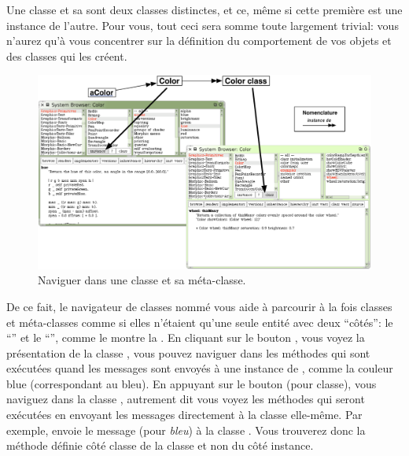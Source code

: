 \documentclass[a4paper,10pt,twoside]{book}
\begin{document}
Une classe et sa  sont deux classes distinctes, et ce, m\^eme si cette premi\`ere est une instance de l'autre. Pour vous, tout ceci sera somme toute largement trivial: vous n'aurez qu'\`a vous concentrer sur la d\'efinition du comportement de vos objets et des classes qui les cr\'eent.

\begin{figure}[htb]
\begin{center}
\includegraphics[width=\textwidth]{Color-Buttons}
\caption{Naviguer dans une classe et sa m\'eta-classe.
\label{fig:Buttons}}
\end{center}
\end{figure}

De ce fait, le navigateur de classes nomm\'e  vous
aide \`a parcourir \`a la fois classes et m\'eta-classes comme si elles
n'\'etaient qu'une seule entit\'e avec deux ``c\^ot\'es'': le ``'' et le ``'', comme le montre la . 
En cliquant sur le 
bouton , vous voyez la pr\'esentation de la classe , \ie vous pouvez naviguer dans les m\'ethodes qui sont ex\'ecut\'ees quand
les messages sont envoy\'es \`a une instance de
, comme la couleur blue (correspondant au bleu). En appuyant
sur le bouton  (pour classe), vous naviguez dans la classe , autrement dit vous voyez les m\'ethodes qui seront ex\'ecut\'ees
en envoyant les messages directement \`a la classe  elle-m\^eme.
Par exemple,  envoie le message  (pour \emph{bleu}) \`a
la classe .
Vous trouverez donc la m\'ethode  d\'efinie c\^ot\'e classe de la classe  et non du c\^ot\'e instance.
\end{document}
